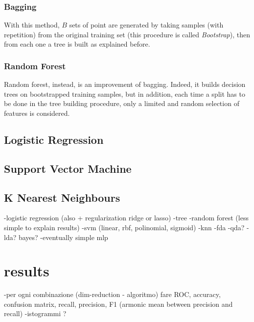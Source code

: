 \documentclass[letterpaper]{article}
\begin{document}
	\subsubsection{Bagging}
	With this method, $B$ sets of point are generated by taking samples (with repetition) from the original training set (this procedure is called \emph{Bootstrap}), then from each one a tree is built as explained before.
	\subsubsection{Random Forest}
	Random forest, instead, is an improvement of bagging. Indeed, it builds decision trees on bootstrapped training samples, but in addition, each time a split has to be done in the tree building procedure, only a limited and random selection of features is considered.
	\subsection{Logistic Regression}
	
	\subsection{Support Vector Machine}
	\subsection{K Nearest Neighbours}
	
	-logistic regression (also + regularization ridge or lasso)
	-tree
	-random forest (less simple to explain results)
	-svm (linear, rbf, polinomial, sigmoid)
	-knn
	-fda
	-qda?
	-lda? bayes?
	-eventually simple mlp
	
	\section{results}
	-per ogni combinazione (dim-reduction - algoritmo) fare ROC, accuracy, confusion matrix, recall, precision, F1 (armonic mean between precision and recall)
	-istogrammi ? 
	
	
	
	\newpage
	\printbibliography
	\nocite{MohriRostamizadehTalwalkar18}
	
	
\end{document}
